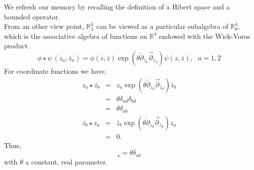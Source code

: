 \documentclass[a4paper,11pt]{article} %
\numberwithin{equation}{section} %
\numberwithin{figure}{section} %
\theoremstyle{plain} %
\theoremstyle{definition} %
\theoremstyle{remark} %
\begin{document}
\noindent
We refresh our memory by recalling the definition of a Hibert space and a bounded operator.
\\

\noindent
From an other view point, $\mathbb{R}^{3}_{\lambda}$ can be viewed as a particular subalgebra of $\mathbb{R}^{4}_{\theta}$, which is the associative algebra of functions on $\mathbb{R}^4$ endowed with the Wick-Voros product. 
\begin{equation*}
 \phi\star \psi\, (z_a,\bar z_a)= \phi(z,\bar z) \exp(\theta \overleftarrow \partial_{z_a}\overrightarrow \partial_{\bar z_a}) \psi(z,\bar z), \,\,\,\, a=1,2 \label{Wick-Vorosprod}
\end{equation*}
For coordinate functions we have,
\begin{eqnarray*}
 z_a \star \bar{z_b} &=& z_a \exp(\theta \overleftarrow \partial_{z_d}\overrightarrow \partial_{\bar z_d}) \bar{z}_{b} \\
                     &=& \theta \delta_{ad} \delta_{bd} \\
                     &=& \theta \delta_{ab} \\
 \bar{z_b} \star z_a &=& \bar{z}_{b} \exp(\theta \overleftarrow \partial_{z_d}\overrightarrow \partial_{\bar z_d}) z_a \\
                     &=& 0.
\end{eqnarray*}
Thus,
\begin{equation*}
 [z_a,\bar z_b]_\star= \theta \delta_{ab} 
\end{equation*}
with $\theta$ a constant, real parameter.\\
\end{document}
